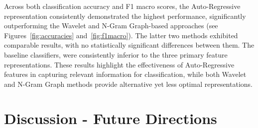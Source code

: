 \documentclass{article}
\begin{document}
Across both classification accuracy and F1 macro scores, the Auto-Regressive representation consistently demonstrated the highest performance, significantly outperforming the Wavelet and N-Gram Graph-based approaches (see Figures~\ref{fig:accuracies} and~\ref{fig:f1macro}). The latter two methods exhibited comparable results, with no statistically significant differences between them. The baseline classifiers, were consistently inferior to the three primary feature representations. These results highlight the effectiveness of Auto-Regressive features in capturing relevant information for classification, while both Wavelet and N-Gram Graph methods provide alternative yet less optimal representations.

\section{Discussion - Future Directions}
\end{document}
